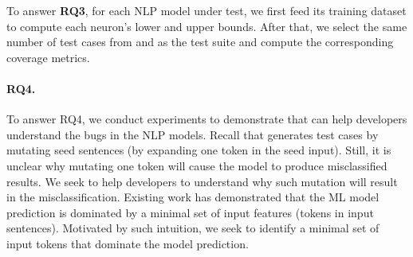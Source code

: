 To answer {\bf RQ3}, for each NLP model under test, we first feed its training dataset to compute each neuron's lower and upper bounds. After that, we select the same number of test cases from \tool and \Cklst as the test suite and compute the corresponding coverage metrics. 


%
%

\paragraph{RQ4.} 

To answer RQ4, we conduct experiments to demonstrate that \tool can help developers understand the bugs in the NLP models.
Recall that \tool generates test cases by mutating seed sentences (\eg by expanding one token in the seed input). Still, it is unclear why mutating one token will cause the model to produce misclassified results.
We seek to help developers to understand why such mutation will result in the misclassification. 
Existing work \cite{simin2020denas, lemna, lime} has demonstrated that the ML model prediction is dominated by a minimal set of input features (\ie tokens in input sentences). Motivated by such intuition, we seek to identify a minimal set of input tokens that dominate the model prediction.

